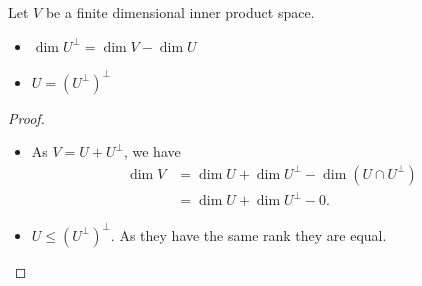 \begin{corollary}
    Let $V$ be a finite dimensional inner product space.

    \begin{itemize}
      \item $\dim U^\perp = \dim V - \dim U$ 
      \item $U = (U^\perp)^\perp$
    \end{itemize}
\end{corollary}
\begin{proof} $ $
  \begin{itemize}
    \item As $V = U + U^\perp$, we have
      \begin{align*}
        \dim V &= \dim U + \dim U^\perp - \dim (U \cap U^\perp) \\
               &= \dim U + \dim U^\perp - 0
      .\end{align*}
    \item $U \leq (U^\perp)^\perp$. As they have the same rank they are equal.
  \end{itemize}
\end{proof}

